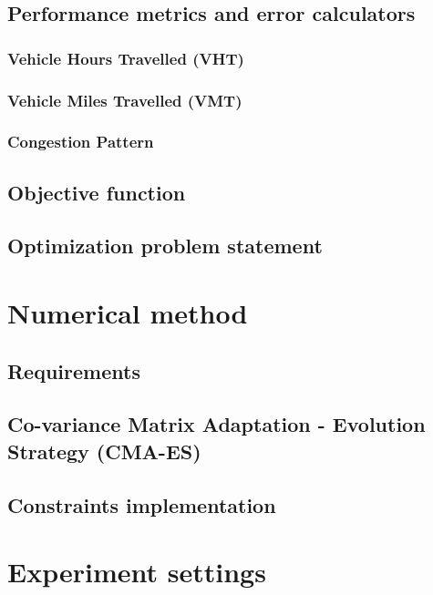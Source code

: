 \subsection{Performance metrics and error calculators}
\label{subsec:pcs_intro}

\subsubsection{Vehicle Hours Travelled (VHT)}
\label{subsubsec:tvh}

\subsubsection{Vehicle Miles Travelled (VMT)}
\label{subsubsec:tvm}

\subsubsection{Congestion Pattern}
\label{subsubsec:cp}

\subsection{Objective function}
\label{subsec:fitnessintro}

\subsection{Optimization problem statement}
\label{subsec:statement}


\section{Numerical method}
\subsection{Requirements}
\label{subsec:requirements}

\subsection{Co-variance Matrix Adaptation - Evolution Strategy (CMA-ES)}
\label{subsec:cmaes}

\subsection{Constraints implementation}
\label{subsec:implementation}



\section{Experiment settings}
\label{experiment_intro}

